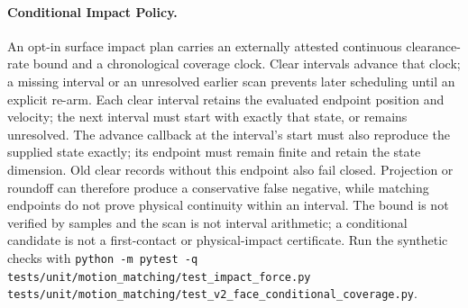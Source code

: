\documentclass{article}
\begin{document}
\paragraph{Conditional Impact Policy.} An opt-in surface impact plan carries
an externally attested continuous clearance-rate bound and a chronological
coverage clock. Clear intervals advance that clock; a missing interval or an
unresolved earlier scan prevents later scheduling until an explicit re-arm.
Each clear interval retains the evaluated endpoint position and velocity;
the next interval must start with exactly that state, or remains unresolved.
The advance callback at the interval's start must also reproduce the supplied
state exactly; its endpoint must remain finite and retain the state dimension.
Old clear records without this endpoint also fail closed. Projection or
roundoff can therefore produce a conservative false negative, while matching
endpoints do not prove physical continuity within an interval.
The bound is not verified by samples and the scan is not interval arithmetic;
a conditional candidate is not a first-contact or physical-impact certificate.
Run the synthetic checks with \texttt{python -m pytest -q
tests/unit/motion\_matching/test\_impact\_force.py
tests/unit/motion\_matching/test\_v2\_face\_conditional\_coverage.py}.
\end{document}
